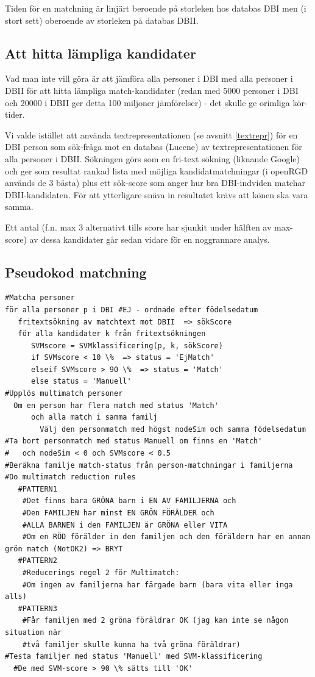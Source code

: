 \documentclass[swedish,11pt]{article}
\begin{document}
Tiden för en matchning är linjärt beroende på storleken hos databas
DBI men (i stort sett) oberoende av storleken på databas DBII.

\subsection{Att hitta lämpliga kandidater}\label{kand}
Vad man inte vill göra är att jämföra alla personer i DBI med alla
personer i DBII för att hitta lämpliga match-kandidater (redan med 5000
personer i DBI och 20000 i DBII ger detta 100 miljoner jämförelser) -
det skulle ge orimliga kör-tider.

Vi valde istället att använda textrepresentationen (se avsnitt
\ref{textrepr}) för en DBI person som sök-fråga mot en databas
(Lucene) av textrepresentationen för alla personer i DBII. Sökningen
görs som en fri-text sökning (liknande Google) och ger som resultat
rankad lista med möjliga kandidatmatchningar (i openRGD används de 3
bästa) plus ett sök-score som anger hur bra DBI-indviden matchar
DBII-kandidaten. För att ytterligare snäva in resultatet krävs att
könen ska vara samma.

Ett antal (f.n. max 3 alternativt tills score har sjunkit under
hälften av max-score) av dessa kandidater går sedan vidare för en noggrannare analys.

\subsection{Pseudokod matchning}
\begin{verbatim}
#Matcha personer
för alla personer p i DBI #EJ - ordnade efter födelsedatum
   fritextsökning av matchtext mot DBII  => sökScore
   för alla kandidater k från fritextsökningen
      SVMscore = SVMklassificering(p, k, sökScore)
      if SVMscore < 10 \%  => status = 'EjMatch'
      elseif SVMscore > 90 \%  => status = 'Match'
      else status = 'Manuell'
#Upplös multimatch personer
  Om en person har flera match med status 'Match'
      och alla match i samma familj
        Välj den personmatch med högst nodeSim och samma födelsedatum
#Ta bort personmatch med status Manuell om finns en 'Match'
#   och nodeSim < 0 och SVMscore < 0.5
#Beräkna familje match-status från person-matchningar i familjerna
#Do multimatch reduction rules
   #PATTERN1
    #Det finns bara GRÖNA barn i EN AV FAMILJERNA och
    #Den FAMILJEN har minst EN GRÖN FÖRÄLDER och
    #ALLA BARNEN i den FAMILJEN är GRÖNA eller VITA
    #Om en RÖD förälder in den familjen och den föräldern har en annan grön match (NotOK2) => BRYT
   #PATTERN2
    #Reducerings regel 2 för Multimatch:
    #Om ingen av familjerna har färgade barn (bara vita eller inga alls)
   #PATTERN3
    #Får familjen med 2 gröna föräldrar OK (jag kan inte se någon situation när
    #två familjer skulle kunna ha två gröna föräldrar)
#Testa familjer med status 'Manuell' med SVM-klassificering
  #De med SVM-score > 90 \% sätts till 'OK'
\end{verbatim}
\end{document}
